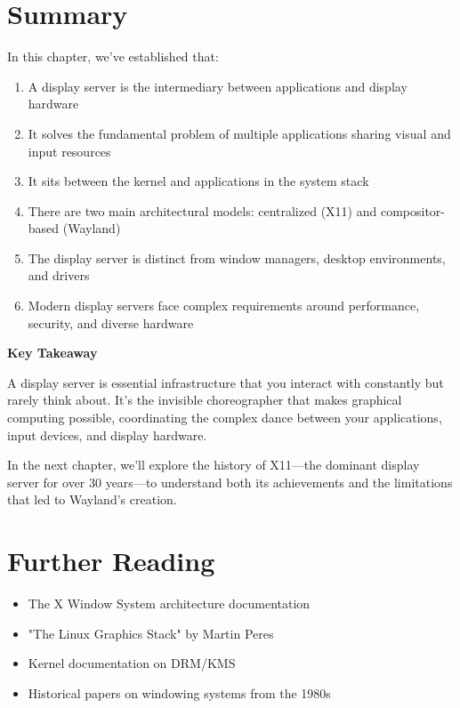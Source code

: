 \section{Summary}

In this chapter, we've established that:

\begin{enumerate}[leftmargin=*]
    \item A display server is the intermediary between applications and display hardware
    \item It solves the fundamental problem of multiple applications sharing visual and input resources
    \item It sits between the kernel and applications in the system stack
    \item There are two main architectural models: centralized (X11) and compositor-based (Wayland)
    \item The display server is distinct from window managers, desktop environments, and drivers
    \item Modern display servers face complex requirements around performance, security, and diverse hardware
\end{enumerate}

\begin{notebox}
\textbf{Key Takeaway}

A display server is essential infrastructure that you interact with constantly but rarely think about. It's the invisible choreographer that makes graphical computing possible, coordinating the complex dance between your applications, input devices, and display hardware.
\end{notebox}

In the next chapter, we'll explore the history of X11—the dominant display server for over 30 years—to understand both its achievements and the limitations that led to Wayland's creation.

\section{Further Reading}

\begin{itemize}[leftmargin=*]
    \item The X Window System architecture documentation
    \item "The Linux Graphics Stack" by Martin Peres
    \item Kernel documentation on DRM/KMS
    \item Historical papers on windowing systems from the 1980s
\end{itemize}
